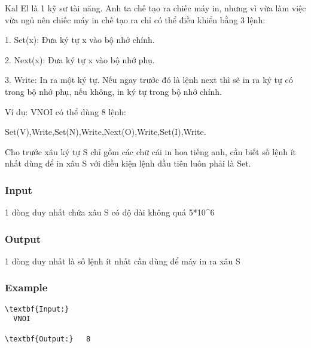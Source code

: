 



    Kal El là 1 kỹ sư tài năng. Anh ta chế tạo ra chiếc máy in, nhưng vì vừa làm việc vừa ngủ nên chiếc máy in chế tạo ra chỉ có thể điều khiển bằng 3 lệnh:   

    1. Set(x): Đưa ký tự x vào bộ nhớ chính.   

    2. Next(x): Đưa ký tự x vào bộ nhớ phụ.   

    3. Write: In ra một ký tự. Nếu ngay trước đó là lệnh next thì sẽ in ra ký tự có trong bộ nhớ phụ, nếu không, in ký tự trong bộ nhớ chính.   

    Ví dụ: VNOI có thể dùng 8 lệnh:   

    Set(V),Write,Set(N),Write,Next(O),Write,Set(I),Write.   

    Cho trước xâu ký tự S chỉ gồm các chữ cái in hoa tiếng anh, cần biết số lệnh ít nhất dùng để in xâu S với điều kiện lệnh đầu tiên luôn phải là Set.   

\subsubsection{    Input   }

    1 dòng duy nhất chứa xâu S có độ dài không quá 5*10^6   

\subsubsection{    Output   }

    1 dòng duy nhất là số lệnh ít nhất cần dùng để máy in ra xâu S   

\subsubsection{    Example   }
\begin{verbatim}
\textbf{Input:}
  VNOI

\textbf{Output:}   8\end{verbatim}
